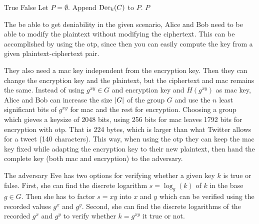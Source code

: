 \begin{algorithm}
  \caption{%
    Algorithm for finding possible plaintexts and discarding false keys.
  }
  \label{alg:falsekeys}
  \begin{algorithmic}
        \State \Return True
      \EndIf
      \State \Return False
    \EndFunction
    \Statex
      \State Let $P = \emptyset$.
          \State Append $\operatorname{\mathrm{Dec}}_k( C )$ to $P$.
        \EndIf
      \EndFor
      \State \Return $P$
    \EndFunction
  \end{algorithmic}
\end{algorithm}

The be able to get deniability in the given scenario, Alice and Bob need to be 
able to modify the plaintext without modifying the ciphertext.
This can be accomplished by using the \ac{otp}, since then you can easily 
compute the key from a given plaintext-ciphertext pair.

They also need a \ac{mac} key independent from the encryption key.
Then they can change the encryption key and the plaintext, but the ciphertext 
and \ac{mac} remains the same.
Instead of using \(g^{xy}\in G\) and encryption key and \(H(g^{xy})\) as 
\ac{mac} key, Alice and Bob can increase the size \(|G|\) of the group \(G\) 
and use the \(n\) least significant bits of \(g^{xy}\) for \ac{mac} and the 
rest for encryption.
Choosing a group which gieves a keysize of 2048 bits, using 256 bits for 
\ac{mac} leaves 1792 bits for encryption with \ac{otp}.
That is 224 bytes, which is larger than what Twitter allows for a tweet (140 
characters).
This way, when using the \ac{otp} they can keep the \ac{mac} key fixed while 
adapting the encryption key to their new plaintext, then hand the complete key 
(both \ac{mac} and encryption) to the adversary.

The adversary Eve has two options for verifying whether a given key \(k\) is 
true or false.
First, she can find the discrete logarithm \(s = \log_g( k )\) of \(k\) in the 
base \(g\in G\).
Then she has to factor \(s = xy\) into \(x\) and \(y\) which can be verified 
using the recorded values \(g^x\) and \(g^y\).
Second, she can find the discrete logarithms of the recorded \(g^x\) and 
\(g^y\) to verify whether \(k = g^{xy}\) it true or not.

